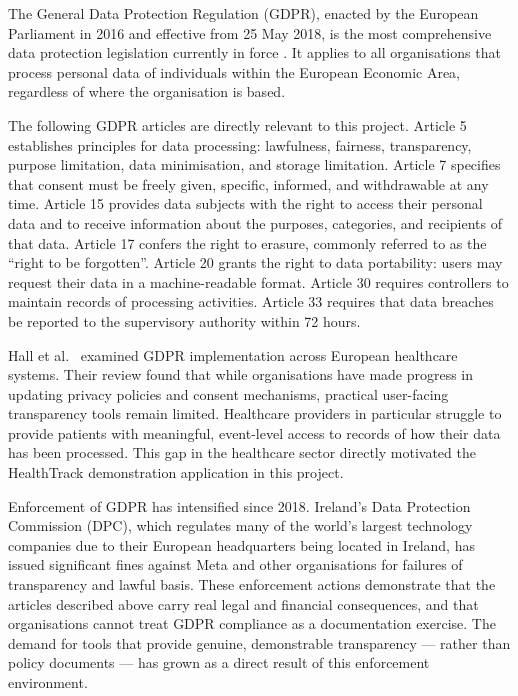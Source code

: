 \documentclass[a4paper,12pt,onecolumn]{report}
\begin{document}
The General Data Protection Regulation (GDPR), enacted by the European Parliament in 2016 and effective from 25 May 2018, is the most comprehensive data protection legislation currently in force \cite{gdpr2016}.
It applies to all organisations that process personal data of individuals within the European Economic Area, regardless of where the organisation is based.

The following GDPR articles are directly relevant to this project.
Article 5 establishes principles for data processing: lawfulness, fairness, transparency, purpose limitation, data minimisation, and storage limitation.
Article 7 specifies that consent must be freely given, specific, informed, and withdrawable at any time.
Article 15 provides data subjects with the right to access their personal data and to receive information about the purposes, categories, and recipients of that data.
Article 17 confers the right to erasure, commonly referred to as the ``right to be forgotten''.
Article 20 grants the right to data portability: users may request their data in a machine-readable format.
Article 30 requires controllers to maintain records of processing activities.
Article 33 requires that data breaches be reported to the supervisory authority within 72 hours.

Hall et al.\ \cite{gdprhealthcare} examined GDPR implementation across European healthcare systems.
Their review found that while organisations have made progress in updating privacy policies and consent mechanisms, practical user-facing transparency tools remain limited.
Healthcare providers in particular struggle to provide patients with meaningful, event-level access to records of how their data has been processed.
This gap in the healthcare sector directly motivated the HealthTrack demonstration application in this project.

Enforcement of GDPR has intensified since 2018.
Ireland's Data Protection Commission (DPC), which regulates many of the world's largest technology companies due to their European headquarters being located in Ireland, has issued significant fines against Meta and other organisations for failures of transparency and lawful basis.
These enforcement actions demonstrate that the articles described above carry real legal and financial consequences, and that organisations cannot treat GDPR compliance as a documentation exercise.
The demand for tools that provide genuine, demonstrable transparency --- rather than policy documents --- has grown as a direct result of this enforcement environment.
\end{document}
